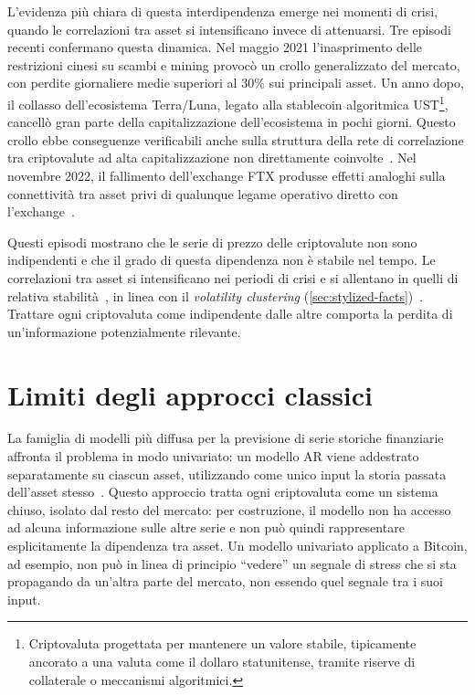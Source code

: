 L'evidenza più chiara di questa interdipendenza emerge nei momenti di crisi, quando le correlazioni tra asset si intensificano invece di attenuarsi. Tre episodi recenti confermano questa dinamica. Nel maggio 2021 l'inasprimento delle restrizioni cinesi su scambi e mining provocò un crollo generalizzato del mercato, con perdite giornaliere medie superiori al 30\% sui principali asset. Un anno dopo, il collasso dell'ecosistema Terra/Luna, legato alla stablecoin algoritmica UST\footnote{Criptovaluta progettata per mantenere un valore stabile, tipicamente ancorato a una valuta come il dollaro statunitense, tramite riserve di collaterale o meccanismi algoritmici.}, cancellò gran parte della capitalizzazione dell'ecosistema in pochi giorni. Questo crollo ebbe conseguenze verificabili anche sulla struttura della rete di correlazione tra criptovalute ad alta capitalizzazione non direttamente coinvolte~\cite{briola2023anatomy}. Nel novembre 2022, il fallimento dell'exchange FTX produsse effetti analoghi sulla connettività tra asset privi di qualunque legame operativo diretto con l'exchange~\cite{akyildirim2023understanding}.

Questi episodi mostrano che le serie di prezzo delle criptovalute non sono indipendenti e che il grado di questa dipendenza non è stabile nel tempo. Le correlazioni tra asset si intensificano nei periodi di crisi e si allentano in quelli di relativa stabilità~\cite{onnela2003dynamics}, in linea con il \emph{volatility clustering} (\cref{sec:stylized-facts})~\cite{cont2001empirical}. Trattare ogni criptovaluta come indipendente dalle altre comporta la perdita di un'informazione potenzialmente rilevante.

\section{Limiti degli approcci classici}
\label{sec:limits-univariate-models}

La famiglia di modelli più diffusa per la previsione di serie storiche finanziarie affronta il problema in modo univariato: un modello AR viene addestrato separatamente su ciascun asset, utilizzando come unico input la storia passata dell'asset stesso~\cite{tsay2010analysis}. Questo approccio tratta ogni criptovaluta come un sistema chiuso, isolato dal resto del mercato: per costruzione, il modello non ha accesso ad alcuna informazione sulle altre serie e non può quindi rappresentare esplicitamente la dipendenza tra asset. Un modello univariato applicato a Bitcoin, ad esempio, non può in linea di principio \enquote{vedere} un segnale di stress che si sta propagando da un'altra parte del mercato, non essendo quel segnale tra i suoi input.

